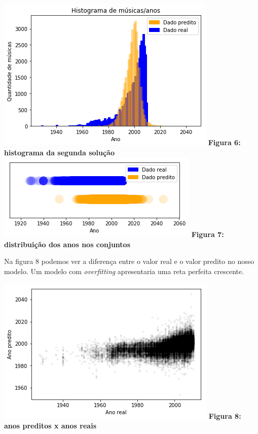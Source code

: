 \documentclass[conference]{IEEEtran}
\begin{document}
\begin{center}
\includegraphics[scale=0.6]{plot5}
\textbf{Figura 6: histograma da segunda solução}
\\
\includegraphics[scale=0.6]{plot6}
\textbf{Figura 7: distribuição dos anos nos conjuntos}
\end{center}

Na figura 8 podemos ver a diferença entre o valor real e o valor predito no nosso modelo. Um modelo com \textit{overfitting} apresentaria uma reta perfeita crescente.

\begin{center}
\includegraphics[scale=0.6]{plot7}
\textbf{Figura 8: anos preditos x anos reais}
\end{center}
\end{document}

